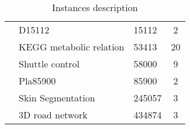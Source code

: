 \begin{table}[!h]
\begin{tabular}{@{}lllc@{}}
         & D15112                          & 15112                 & 2                  \\
         & KEGG metabolic relation         & 53413                 & 20                 \\
         & Shuttle control                 & 58000                 & 9                  \\
         & Pla85900                        & 85900                 & 2                  \\
         & Skin Segmentation               & 245057                & 3                  \\
         & 3D road network                 & 434874                & 3                  \\ \bottomrule
\end{tabular}
\caption{Instances description}
\label{instances}
\end{table}